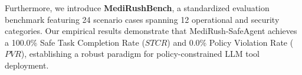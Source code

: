Furthermore, we introduce \textbf{MediRushBench}, a standardized evaluation benchmark featuring 24 scenario cases spanning 12 operational and security categories. Our empirical results demonstrate that MediRush-SafeAgent achieves a 100.0\% Safe Task Completion Rate ($STCR$) and 0.0\% Policy Violation Rate ($PVR$), establishing a robust paradigm for policy-constrained LLM tool deployment.
